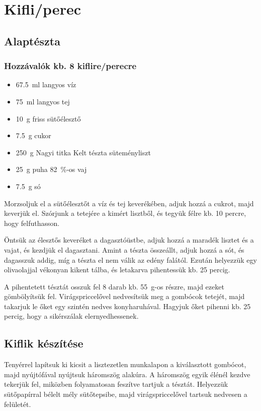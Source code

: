 \newpage
\section{Kifli/perec} \label{sec:kifli-perec}

\subsection*{Alaptészta}
\subsubsection*{Hozzávalók kb. 8 kiflire/perecre}
\begin{itemize}
    \item \qty{67.5}{\ml} langyos víz
    \item \qty{75}{\ml} langyos tej
    \item \qty{10}{\g} friss sütőélesztő
    \item \qty{7.5}{\g} cukor
    \item \qty{250}{\g} Nagyi titka Kelt tészta süteményliszt
    \item \qty{25}{\g} puha \qty{82}{\percent}-os vaj
    \item \qty{7.5}{\g} só
\end{itemize}

Morzsoljuk el a sütőélesztőt a víz és tej keverékében, adjuk hozzá a cukrot, majd keverjük el. Szórjunk a tetejére a kimért lisztből, és tegyük félre kb. \num{10} percre, hogy felfuthasson.

Öntsük az élesztős keveréket a dagasztóüstbe, adjuk hozzá a maradék lisztet és a vajat, és kezdjük el dagasztani. Amint a tészta összeállt, adjuk hozzá a sót, és dagasszuk addig, míg a tészta el nem válik az edény falától. Ezután helyezzük egy olivaolajjal vékonyan kikent tálba, és letakarva pihentessük kb. \num{25} percig.

A pihentetett tésztát osszuk fel \num{8} darab kb. \qty{55}{\g}-os részre, majd ezeket gömbölyítsük fel. Virágspriccelővel nedvesítsük meg a gombócok tetejét, majd takarjuk le őket egy szintén nedves konyharuhával. Hagyjuk őket pihenni kb. \num{25} percig, hogy a sikérszálak elernyedhessenek.~\cite{szabi_kifli}

\subsection*{Kiflik készítése}
Tenyérrel lapítsuk ki kicsit a lisztezetlen munkalapon a kiválasztott gombócot, majd nyújtófával nyújtsuk háromszög alakúra. A háromszög egyik élénél kezdve tekerjük fel, miközben folyamatosan feszítve tartjuk a tésztát. Helyezzük sütőpapírral bélelt mély sütőtepsibe, majd virágspriccelővel tartsuk nedvesen a felületét.

